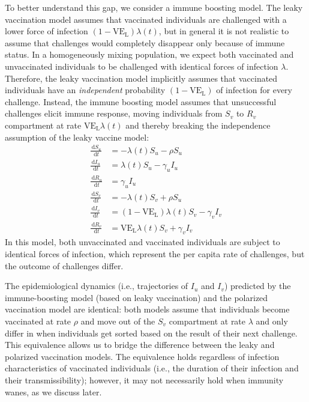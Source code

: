 \documentclass[12pt]{article}
\newcommand{\dd}[1]{\ensuremath{\, \mathrm{d}#1}}
\newcommand{\VE}{\ensuremath{\mathrm{VE}}}
\newcommand{\VEL}{\ensuremath{\VE_{\mathrm{L}}}}
\begin{document}
To better understand this gap, we consider a immune boosting model.
The leaky vaccination model assumes that vaccinated individuals are challenged with a lower force of infection $(1-\VEL) \lambda(t)$, but in general it is not realistic to assume that challenges would completely disappear only because of immune status.
In a homogeneously mixing population, we expect both vaccinated and unvaccinated individuals to be challenged with identical forces of infection $\lambda$.
Therefore, the leaky vaccination model implicitly assumes that vaccinated individuals have an \emph{independent} probability $(1-\VEL)$ of infection for every challenge.
Instead, the immune boosting model assumes that unsuccessful challenges elicit immune response, moving individuals from $S_v$ to $R_v$ compartment at rate $\VEL \lambda(t)$ and thereby breaking the independence assumption of the leaky vaccine model:  
\begin{align}
\frac{\dd S_u}{\dd t} &= - \lambda(t) S_u - \rho S_u \\
\frac{\dd I_u}{\dd t} &= \lambda(t) S_u - \gamma_u I_u \\
\frac{\dd R_u}{\dd t} &= \gamma_u I_u \\
\frac{\dd S_v}{\dd t} &= - \lambda(t) S_v + \rho S_u \\
\frac{\dd I_v}{\dd t} &= (1-\VEL) \lambda(t) S_v - \gamma_v I_v \\
\frac{\dd R_v}{\dd t} &= \VEL \lambda(t) S_v + \gamma_v I_v
\end{align}
In this model, both unvaccinated and vaccinated individuals are subject to identical forces of infection, which represent the per capita rate of challenges, but the outcome of challenges differ.

The epidemiological dynamics (i.e., trajectories of $I_u$ and $I_v$) predicted by the immune-boosting model (based on leaky vaccination) and the polarized vaccination model are identical: 
both models assume that individuals become vaccinated at rate $\rho$ and move out of the $S_v$ compartment at rate $\lambda$ and only differ in when individuals get sorted based on the result of their next challenge.
This equivalence allows us to bridge the difference between the leaky and polarized vaccination models.
The equivalence holds regardless of infection characteristics of vaccinated individuals (i.e., the duration of their infection and their transmissibility);
however, it may not necessarily hold when immunity wanes, as we discuss later.
\end{document}
